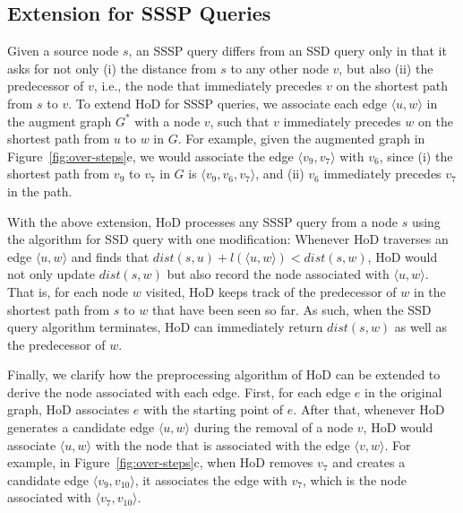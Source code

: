 \documentclass{sig-alternate}
\def\G{G^*}
\def\d{dist}
\begin{document}
\begin{sloppy}
%


\section{Extension for SSSP Queries} \label{sec:exten}

Given a source node $s$, an SSSP query differs from an SSD query only in that it asks for not only (i) the distance from $s$ to any other node $v$, but also (ii) the predecessor of $v$, i.e., the node that immediately precedes $v$ on the shortest path from $s$ to $v$. To extend HoD for SSSP queries, we associate each edge $\langle u, w\rangle$ in the augment graph $\G$ with a node $v$, such that $v$ immediately precedes $w$ on the shortest path from $u$ to $w$ in $G$. For example, given the augmented graph in Figure~\ref{fig:over-steps}e, we would associate the edge $\langle v_9, v_7\rangle$ with $v_6$, since (i) the shortest path from $v_9$ to $v_7$ in $G$ is $\langle v_9, v_6, v_7\rangle$, and (ii) $v_6$ immediately precedes $v_7$ in the path.

With the above extension, HoD processes any SSSP query from a node $s$ using the algorithm for SSD query with one modification: Whenever HoD traverses an edge $\langle u, w\rangle$ and finds that $\d(s, u) + l(\langle u, w \rangle) < \d(s, w)$, HoD would not only update $\d(s, w)$ but also record the node associated with $\langle u, w\rangle$. That is, for each node $w$ visited, HoD keeps track of the predecessor of $w$ in the shortest path from $s$ to $w$ that have been seen so far. As such, when the SSD query algorithm terminates, HoD can immediately return $\d(s, w)$ as well as the predecessor of $w$.

Finally, we clarify how the preprocessing algorithm of HoD can be extended to derive the node associated with each edge. First, for each edge $e$ in the original graph, HoD associates $e$ with the starting point of $e$. After that, whenever HoD generates a candidate edge $\langle u, w\rangle$ during the removal of a node $v$, HoD would associate $\langle u, w\rangle$ with the node that is associated with the edge $\langle v, w\rangle$. For example, in Figure~\ref{fig:over-steps}c, when HoD removes $v_7$ and creates a candidate edge $\langle v_9, v_{10}\rangle$, it associates the edge with $v_7$, which is the node associated with $\langle v_7, v_{10}\rangle$.





\end{sloppy}
\end{document}
